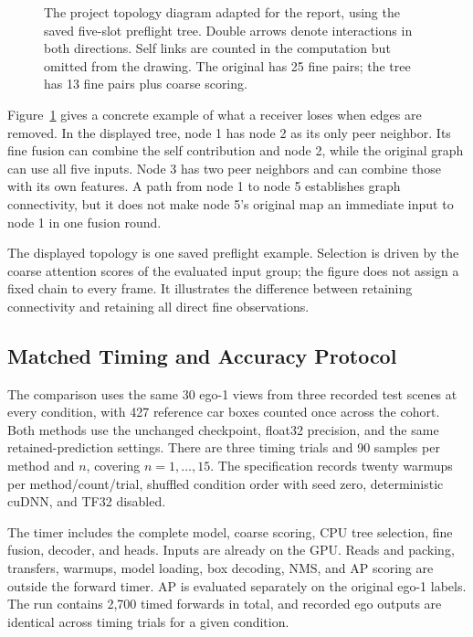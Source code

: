 \begin{figure}[htbp]
\centering

\caption[Complete collaboration and the saved five-slot tree]{The project
topology diagram adapted for the report, using the saved five-slot preflight
tree. Double arrows denote interactions in both directions. Self links
are counted in the computation but omitted from the drawing. The original
has 25 fine pairs; the tree has 13 fine pairs plus coarse scoring.}
\label{fig:tree-topology}
\end{figure}

Figure~\ref{fig:tree-topology} gives a concrete example of what a receiver
loses when edges are removed. In the displayed tree, node 1 has node 2 as
its only peer neighbor. Its fine fusion can combine the self contribution
and node 2, while the original graph can use all five inputs. Node 3 has
two peer neighbors and can combine those with its own features. A path
from node 1 to node 5 establishes graph connectivity, but it does not
make node 5's original map an immediate input to node 1 in one fusion round.

The displayed topology is one saved preflight example. Selection is driven
by the coarse attention scores of the evaluated input group; the figure
does not assign a fixed chain to every frame. It illustrates the difference
between retaining connectivity and retaining all direct fine observations.

\subsection{Matched Timing and Accuracy Protocol}
The comparison uses the same 30 ego-1 views from three recorded test scenes
at every condition, with 427 reference car boxes counted once across the
cohort. Both methods use the unchanged checkpoint, float32 precision, and
the same retained-prediction settings. There are three timing trials and 90
samples per method and $n$, covering $n=1,\ldots,15$. The specification records
twenty warmups per method/count/trial, shuffled condition order with seed
zero, deterministic cuDNN, and TF32 disabled.

The timer includes the complete model, coarse scoring, CPU tree selection,
fine fusion, decoder, and heads. Inputs are already on the GPU. Reads and
packing, transfers, warmups, model loading, box decoding, NMS, and AP scoring
are outside the forward timer. AP is evaluated separately on the original
ego-1 labels. The run contains 2,700 timed forwards in total, and recorded ego
outputs are identical across timing trials for a given condition.

